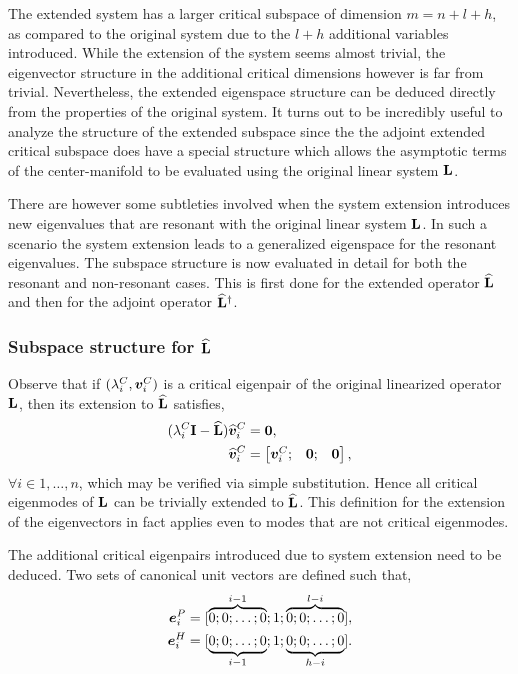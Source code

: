 The extended system has a larger critical subspace of dimension $m = n+l+h$, as compared to the original system due to the $l+h$ additional variables introduced. While the extension of the system seems almost trivial, the eigenvector structure in the additional critical dimensions however is far from trivial. Nevertheless, the extended eigenspace structure can be deduced directly from the properties of the original system. It turns out to be incredibly useful to analyze the structure of the extended subspace since the the adjoint extended critical subspace does have a special structure which allows the asymptotic terms of the center-manifold to be evaluated using the original linear system $\mathbf{L}$. 

There are however some subtleties involved when the system extension introduces new eigenvalues that are resonant with the original linear system $\mathbf{L}$. In such a scenario the system extension leads to a generalized eigenspace for the resonant eigenvalues. The subspace structure is now evaluated in detail for both the resonant and non-resonant cases. This is first done for the extended operator $\mathbf{\widehat{L}}$ and then for the adjoint operator $\mathbf{\widehat{L}}^{\dagger}$. 

\subsubsection{Subspace structure for $\mathbf{\widehat{L}}$}

Observe that if $(\lambda^{C}_{i}, \boldsymbol{v}^{C}_{i})$ is a critical eigenpair of the original linearized operator $\mathbf{L}$, then its extension to $\mathbf{\widehat{L}}$ satisfies,
\begin{subequations}
	\begin{align}
		(\lambda^{C}_{i}\mathbf{I} - \mathbf{\widehat{L}}){\widehat{\boldsymbol{v}}}^{C}_{i} &= \boldsymbol{0}, \\
			{\widehat{\boldsymbol{v}}}^{C}_{i} &= \begin{bmatrix}
			\boldsymbol{v}^{C}_{i}; &
			\boldsymbol{0}; &
			\boldsymbol{0}
		\end{bmatrix},
	\end{align}
\end{subequations}
$\forall i\in 1,\ldots,n$, which may be verified via simple substitution. Hence all critical eigenmodes of $\mathbf{L}$ can be trivially extended to $\mathbf{\widehat{L}}$. This definition for the extension of the eigenvectors in fact applies even to modes that are not critical eigenmodes. 

The additional critical eigenpairs introduced due to system extension need to be deduced. Two sets of canonical unit vectors are defined such that,
\begin{subequations}
	\begin{align}
		\label{eqn:zeta_i_l}
		\boldsymbol{e}^{P}_{i} = [\overbrace{0;0;\ldots;0}^{i-1};1;\overbrace{0;0;\ldots;0}^{l-i}], \\
		\boldsymbol{e}^{H}_{i} = [\underbrace{0;0;\ldots;0}_{i-1};1;\underbrace{0;0;\ldots;0}_{h-i}].
	\end{align}
\end{subequations}

